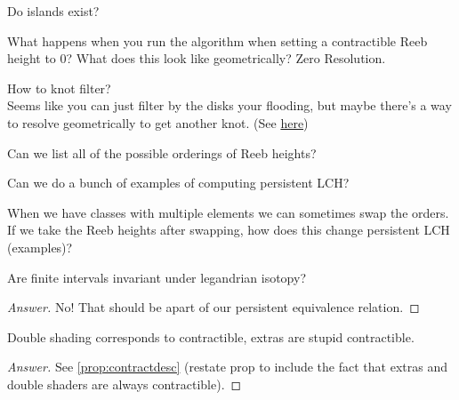 \documentclass[General-Information/Most_recent_log(3_0).tex]{subfiles}
\begin{document}
\begin{question}
    Do islands exist?
\end{question}

\begin{question}
    What happens when you run the algorithm when setting a contractible Reeb height to 0? What does this look like geometrically? Zero Resolution.
\end{question}

\begin{question}
    How to knot filter? \\
    Seems like you can just filter by the disks your flooding, but maybe there's a way to resolve geometrically to get another knot. (See \href{http://www.math.titech.ac.jp/~kalman/cobordism-talk.pdf}{here})
\end{question}



\begin{question}

Can we list all of the possible orderings of Reeb heights?
\end{question}

\begin{question}

Can we do a bunch of examples of computing persistent LCH?
\end{question}

\begin{question}
When we have classes with multiple elements we can sometimes swap the orders. If we take the Reeb heights after swapping, how does this change persistent LCH (examples)?
\end{question}

\begin{question}
Are finite intervals invariant under legandrian isotopy?
\end{question}
\begin{proof}[Answer]
    No! That should be apart of our persistent equivalence relation.
\end{proof}

\begin{question}
Double shading corresponds to contractible, extras are stupid contractible.
\end{question}
\begin{proof}[Answer]
    See \ref{prop:contractdesc} (\TODO restate prop to include the fact that extras and double shaders are always contractible).
\end{proof}
\end{document}
